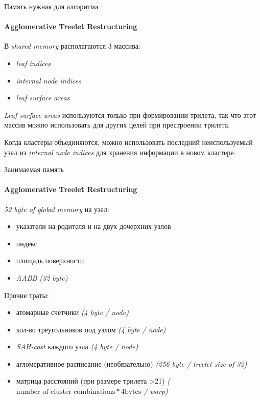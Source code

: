 \begin{frame}[t]{Память нужная для алгоритма}
    \framesubtitle{Agglomerative Treelet Restructuring}
    В \textit{shared memory} располагаются 3 массива:
    \begin{itemize}
        \item
            \textit{leaf indices}
        \item
            \textit{internal node indices}
        \item
            \textit{leaf surface areas}
    \end{itemize}
    \textit{Leaf surface areas} используются только при формировании трилета, так что этот массив можно использовать для других целей
    при престроении трилета.

    Когда кластеры объединяются, можно использовать последний неиспользуемый узел из \textit{internal node indices} для хранения
    информации в новом кластере.
\end{frame}

\begin{frame}[t]{Занимаемая память}
    \framesubtitle{Agglomerative Treelet Restructuring}
    \textit{52 byte of global memory} на узел:
    \begin{itemize}
        \item
            указатели на родителя и на двух дочерхних узлов
        \item
            индекс
        \item
            площадь поверхности
        \item
            \textit{AABB (32 byte)}
    \end{itemize}
    Прочие траты:
    \begin{itemize}
        \item
            атомарные счетчики
            \textit{(4 byte / node)}
        \item
            кол-во треугольников под узлом
            \textit{(4 byte / node)}
        \item
            \textit{SAH-cost} каждого узла
            \textit{(4 byte / node)}
        \item
            агломеративное расписание (необязательно)
            \textit{(256 byte / treelet size of 32)}
        \item
            матрица расстояний (при размере трилета >21)
            \textit{($\text {number of cluster combinations} * 4 \text{bytes}$ / warp)}

    \end{itemize}

\end{frame}

